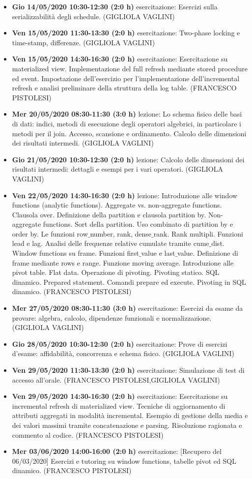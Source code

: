 \begin{itemize}
	\item \textbf{Gio 14/05/2020 10:30-12:30 (2:0 h)} esercitazione: Esercizi sulla serializzabilità degli schedule. (GIGLIOLA VAGLINI)
	\item \textbf{Ven 15/05/2020 11:30-13:30 (2:0 h)} esercitazione: Two-phase locking e time-stamp, differenze. (GIGLIOLA VAGLINI)
	\item \textbf{Ven 15/05/2020 14:30-16:30 (2:0 h)} esercitazione: Esercitazione su materialized view. Implementazione del full refresh mediante stored procedure ed event. Impostazione dell'esercizio per l'implementazione dell'incremental refresh e analisi preliminare della struttura della log table. (FRANCESCO PISTOLESI)
	\item \textbf{Mer 20/05/2020 08:30-11:30 (3:0 h)} lezione: Lo schema fisico delle basi di dati: indici, metodi di esecuzione degli operatori algebrici, in particolare i metodi per il join. Accesso, scansione e ordinamento. Calcolo delle dimensioni dei risultati intermedi. (GIGLIOLA VAGLINI)
	\item \textbf{Gio 21/05/2020 10:30-12:30 (2:0 h)} lezione: Calcolo delle dimensioni dei risultati intermedi: dettagli e esempi per i vari operatori. (GIGLIOLA VAGLINI)
	\item \textbf{Ven 22/05/2020 14:30-16:30 (2:0 h)} lezione: Introduzione alle window functions (analytic functions). Aggregate vs. non-aggregate functions. Clausola over. Definizione della partition e clausola partition by. Non-aggregate functions. Sort della partition. Uso combinato di partition by e order by. Le funzioni row$\_$number, rank, dense$\_$rank. Rank multipli. Funzioni lead e lag. Analisi delle frequenze relative cumulate tramite cume$\_$dist. Window functions su frame. Funzioni first$\_$value e last$\_$value. Definizione di frame mediante rows e range. Funzione moving average. Introduzione alle pivot table. Flat data. Operazione di pivoting. Pivoting statico. SQL dinamico. Prepared statement. Comandi prepare ed execute. Pivoting in SQL dinamico. (FRANCESCO PISTOLESI)
	\item \textbf{Mer 27/05/2020 08:30-11:30 (3:0 h)} esercitazione: Esercizi da esame da provare: algebra, calcolo, dipendenze funzionali e normalizzazione. (GIGLIOLA VAGLINI)
	\item \textbf{Gio 28/05/2020 10:30-12:30 (2:0 h)} esercitazione: Prove di esercizi d'esame: affidabilità, concorrenza e schema fisico. (GIGLIOLA VAGLINI)
	\item \textbf{Ven 29/05/2020 11:30-13:30 (2:0 h)} esercitazione: Simulazione di test di accesso all'orale. (FRANCESCO PISTOLESI,GIGLIOLA VAGLINI)
	\item \textbf{Ven 29/05/2020 14:30-16:30 (2:0 h)} esercitazione: Esercitazione su incremental refresh di materialized view. Tecniche di aggiornamento di attributi aggregati in modalità incremental. Esempio di gestione della media e dei valori massimi tramite concatenazione e parsing. Risoluzione ragionata e commento al codice. (FRANCESCO PISTOLESI)
	\item \textbf{Mer 03/06/2020 14:00-16:00 (2:0 h)} esercitazione: [Recupero del 06/03/2020] Esercizi e tutoring su window functions, tabelle pivot ed SQL dinamico. (FRANCESCO PISTOLESI)
\end{itemize}
\normalsize